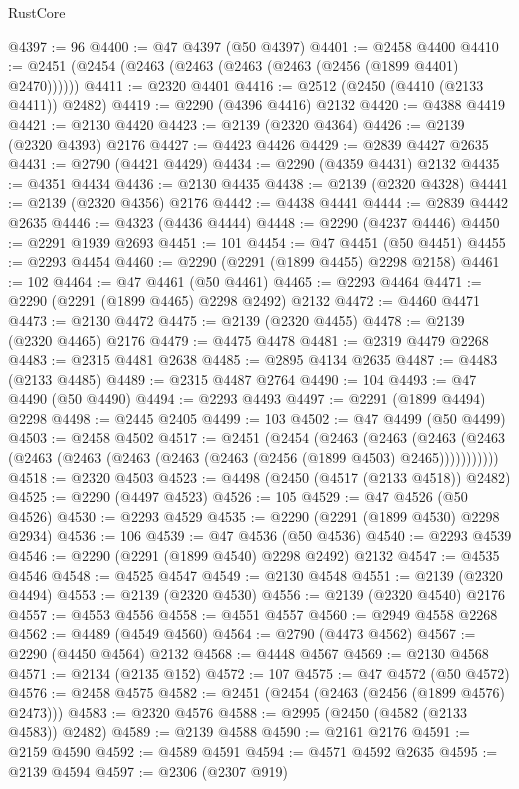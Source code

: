 \begin{lexlean}{RustCore}
\begin{coremodule}
@4397 := 96
@4400 := @47 @4397 (@50 @4397)
@4401 := @2458 @4400
@4410 := @2451 (@2454 (@2463 (@2463 (@2463 (@2463 (@2456 (@1899 @4401) @2470))))))
@4411 := @2320 @4401
@4416 := @2512 (@2450 (@4410 (@2133 @4411)) @2482)
@4419 := @2290 (@4396 @4416) @2132
@4420 := @4388 @4419
@4421 := @2130 @4420
@4423 := @2139 (@2320 @4364)
@4426 := @2139 (@2320 @4393) @2176
@4427 := @4423 @4426
@4429 := @2839 @4427 @2635
@4431 := @2790 (@4421 @4429)
@4434 := @2290 (@4359 @4431) @2132
@4435 := @4351 @4434
@4436 := @2130 @4435
@4438 := @2139 (@2320 @4328)
@4441 := @2139 (@2320 @4356) @2176
@4442 := @4438 @4441
@4444 := @2839 @4442 @2635
@4446 := @4323 (@4436 @4444)
@4448 := @2290 (@4237 @4446)
@4450 := @2291 @1939 @2693
@4451 := 101
@4454 := @47 @4451 (@50 @4451)
@4455 := @2293 @4454
@4460 := @2290 (@2291 (@1899 @4455) @2298 @2158)
@4461 := 102
@4464 := @47 @4461 (@50 @4461)
@4465 := @2293 @4464
@4471 := @2290 (@2291 (@1899 @4465) @2298 @2492) @2132
@4472 := @4460 @4471
@4473 := @2130 @4472
@4475 := @2139 (@2320 @4455)
@4478 := @2139 (@2320 @4465) @2176
@4479 := @4475 @4478
@4481 := @2319 @4479 @2268
@4483 := @2315 @4481 @2638
@4485 := @2895 @4134 @2635
@4487 := @4483 (@2133 @4485)
@4489 := @2315 @4487 @2764
@4490 := 104
@4493 := @47 @4490 (@50 @4490)
@4494 := @2293 @4493
@4497 := @2291 (@1899 @4494) @2298
@4498 := @2445 @2405
@4499 := 103
@4502 := @47 @4499 (@50 @4499)
@4503 := @2458 @4502
@4517 := @2451
    (@2454
      (@2463
        (@2463
          (@2463 (@2463 (@2463 (@2463 (@2463 (@2463 (@2463 (@2456 (@1899 @4503) @2465)))))))))))
@4518 := @2320 @4503
@4523 := @4498 (@2450 (@4517 (@2133 @4518)) @2482)
@4525 := @2290 (@4497 @4523)
@4526 := 105
@4529 := @47 @4526 (@50 @4526)
@4530 := @2293 @4529
@4535 := @2290 (@2291 (@1899 @4530) @2298 @2934)
@4536 := 106
@4539 := @47 @4536 (@50 @4536)
@4540 := @2293 @4539
@4546 := @2290 (@2291 (@1899 @4540) @2298 @2492) @2132
@4547 := @4535 @4546
@4548 := @4525 @4547
@4549 := @2130 @4548
@4551 := @2139 (@2320 @4494)
@4553 := @2139 (@2320 @4530)
@4556 := @2139 (@2320 @4540) @2176
@4557 := @4553 @4556
@4558 := @4551 @4557
@4560 := @2949 @4558 @2268
@4562 := @4489 (@4549 @4560)
@4564 := @2790 (@4473 @4562)
@4567 := @2290 (@4450 @4564) @2132
@4568 := @4448 @4567
@4569 := @2130 @4568
@4571 := @2134 (@2135 @152)
@4572 := 107
@4575 := @47 @4572 (@50 @4572)
@4576 := @2458 @4575
@4582 := @2451 (@2454 (@2463 (@2456 (@1899 @4576) @2473)))
@4583 := @2320 @4576
@4588 := @2995 (@2450 (@4582 (@2133 @4583)) @2482)
@4589 := @2139 @4588
@4590 := @2161 @2176
@4591 := @2159 @4590
@4592 := @4589 @4591
@4594 := @4571 @4592 @2635
@4595 := @2139 @4594
@4597 := @2306 (@2307 @919)

\end{coremodule}
\end{lexlean}
